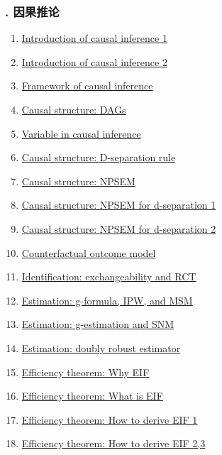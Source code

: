 \documentclass[11pt]{article}
\begin{document}
\vspace{-1cm}

\subsubsection*{. 因果推论}

\vspace{-0.5cm}

\begin{multicols}{2}
	\begin{enumerate}
		\item \href{https://mp.weixin.qq.com/s/W92ZurwB0431bOjolErMcQ}{Introduction of causal inference 1}	%
		\item \href{https://mp.weixin.qq.com/s/8R9Tew3wshkK_95TIfNQeQ}{Introduction of causal inference 2}	%
		\item \href{https://mp.weixin.qq.com/s/2LjJU_2HnIQuVikL2nJGXQ}{Framework of causal inference}	%
		\item \href{https://mp.weixin.qq.com/s/9-aAIHYw7cIScdiZkmyDjg}{Causal structure: DAGs}	%
		\item \href{https://mp.weixin.qq.com/s/3gdqkn7SgzBf1jzQX-cfxw}{Variable in causal inference}	%
		\item \href{https://mp.weixin.qq.com/s/anf-w03I-eiUCfSy7jaYDg}{Causal structure: D-separation rule}	%
		\item \href{https://mp.weixin.qq.com/s/3ko1L3dg_2_z7cvpI02Gsw}{Causal structure: NPSEM}	%
		\item \href{https://mp.weixin.qq.com/s/Mld8h9U1qgeg_myPnbYTbQ}{\small Causal structure: NPSEM for d-separation 1}	%
		\item \href{https://mp.weixin.qq.com/s/ZooQicl91QtUglL867KPsw}{\small Causal structure: NPSEM for d-separation 2}	%
		\item \href{https://mp.weixin.qq.com/s/1s1W5jLFTNFEBXbC1pMNqw}{Counterfactual outcome model}	%
		\item \href{https://mp.weixin.qq.com/s/L0rovGlXJF78IuaPsQBb4g}{Identification: exchangeability and RCT}	%
		\item \href{https://mp.weixin.qq.com/s/czrPh4QeGfloK0C8HwkDoA}{Estimation: g-formula, IPW, and MSM}	%
		\item \href{https://mp.weixin.qq.com/s/VhO4AD5lIPQtHEbFsDBKSw}{Estimation: g-estimation and SNM}	%
		\item \href{https://mp.weixin.qq.com/s/byaU2Ja7p2fipSJBPZhFhw}{Estimation: doubly robust estimator}	%
		\item \href{https://mp.weixin.qq.com/s/K68QFvy2kBbAZg7P0mipeA}{Efficiency theorem: Why EIF}	%
		\item \href{https://mp.weixin.qq.com/s/tVgr9wOWmP8Uuami5H_PkA}{Efficiency theorem: What is EIF}	%
		\item \href{https://mp.weixin.qq.com/s/VtDcsaEEdxR1yZmdz9eB-g}{Efficiency theorem: How to derive EIF 1}	%
		\item \href{https://mp.weixin.qq.com/s/r7wr1zonO-GGEGyVyLxWQA}{Efficiency theorem: How to derive EIF 2,3}	%
	\end{enumerate}
\end{multicols}
\end{document}
